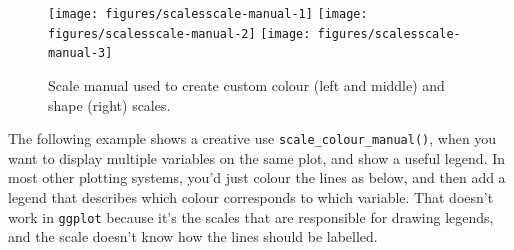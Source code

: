 \begin{Shaded}
\begin{Highlighting}[]
\StringTok{ }  \NormalTok{)}
\StringTok{ }\NormalTok{(} \StringTok{ }
\StringTok{  }\NormalTok{(} \NormalTok{(}\NormalTok{, }\NormalTok{, }\NormalTok{, }\NormalTok{))}
\StringTok{ }\NormalTok{(} \NormalTok{, } \NormalTok{, } \NormalTok{, } \NormalTok{)}
\StringTok{ }\NormalTok{(} \StringTok{ }\NormalTok{(} 
\StringTok{ }\NormalTok{(} \StringTok{ }
\StringTok{  }\NormalTok{(} \NormalTok{(}\NormalTok{, }\NormalTok{, }\NormalTok{, }\NormalTok{))}
\end{Highlighting}
\end{Shaded}

\begin{figure}
\texttt{[image: figures/scalesscale-manual-1]} \texttt{[image: figures/scalesscale-manual-2]} \texttt{[image: figures/scalesscale-manual-3]} \caption{Scale manual used to create custom colour (left and middle) and shape (right) scales.\label{fig:scale-manual}}
\end{figure}

The following example shows a creative use
\texttt{scale\_colour\_manual()}, when you want to display multiple
variables on the same plot, and show a useful legend. In most other
plotting systems, you'd just colour the lines as below, and then add a
legend that describes which colour corresponds to which variable. That
doesn't work in \texttt{ggplot} because it's the scales that are
responsible for drawing legends, and the scale doesn't know how the
lines should be labelled.

